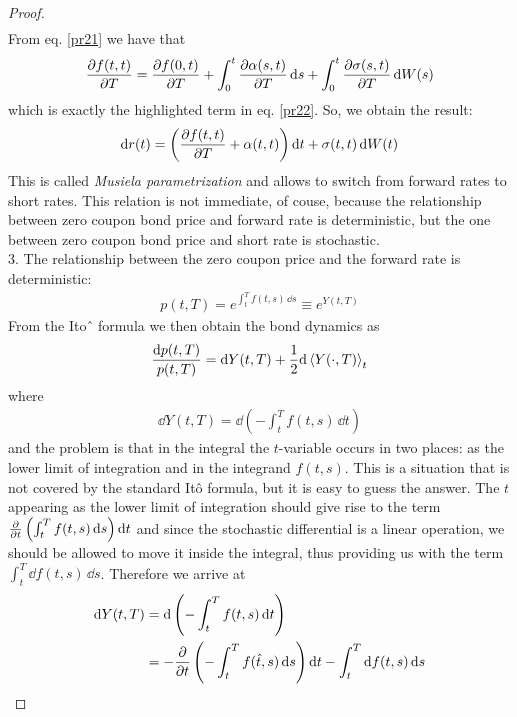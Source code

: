 \begin{proof}
\begin{align*}
    \end{align*}
    From eq. \eqref{pr21} we have that
    \begin{align*}
        \pdv{f(t,t)}{T} = \pdv{f(0,t)}{T} + \int_0^t \pdv{\alpha(s,t)}{T}\,\dd s + \int_0^t \pdv{\sigma(s,t)}{T}\,\dd W(s)
    \end{align*}
    which is exactly the highlighted term in eq. \eqref{pr22}. So, we obtain the result:
    \begin{align*}
        \dd r(t) = \left(\pdv{f(t,t)}{T} + \alpha(t,t)\right)\dd t + \sigma(t,t)\,\dd W(t)
    \end{align*}
    This is called \emph{Musiela parametrization} and allows to switch from forward rates to short rates. This relation is not immediate, of couse, because the relationship between zero coupon bond price and forward rate is deterministic, but the one between zero coupon bond price and short rate is stochastic.\\
    3. The relationship between the zero coupon price and the forward rate is deterministic:
    \begin{align*}
        p(t,T) = e^{\int_t^T f(t,s)\,\dd s} \equiv e^{Y(t,T)}
    \end{align*}
    From the Itoˆ formula we then obtain the bond dynamics as
    \begin{align*}
        \frac{\dd p(t,T)}{p(t,T)} = \dd Y(t,T) + \frac{1}{2}\dd \expval{Y(\cdot, T)}_t
    \end{align*}
    where
    \begin{align*}
        \dd Y(t,T) = \dd\left(-\int_t^T f(t,s)\,\dd t\right)
    \end{align*}
    and the problem is that in the integral the $t$-variable occurs in two places: as the lower limit of integration and in the integrand $f(t, s)$. This is a situation that is not covered by the standard Itô formula, but it is easy to guess the answer. The $t$ appearing as the lower limit of integration should give rise to the term $\pdv{}{t}\left(\int_t^T f(t,s)\,\dd s\right)\dd t$ and since the stochastic differential is a linear operation, we should be allowed to move it inside the integral, thus providing us with the term $\int_t^T \dd f(t,s)\,\dd s$. Therefore we arrive at
    \begin{align*}
        \dd Y(t,T) &= \dd\left(-\int_t^T f(t,s)\,\dd t\right) \\
        &=
        -\pdv{}{t}\left(-\int_t^T f(\hat{t},s)\,\dd s\right)\dd t - \int_t^T \dd f(t,s)\,\dd s \\ %

\end{align*}
\end{proof}
